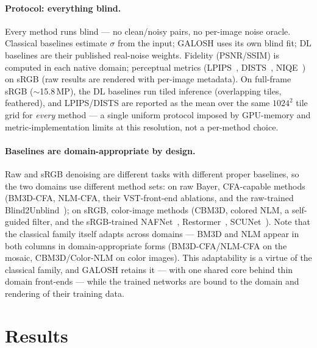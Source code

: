 \documentclass[10pt,twocolumn]{article}
\begin{document}
\paragraph{Protocol: everything blind.} Every method runs blind --- no
clean/noisy pairs, no per-image noise oracle. Classical baselines estimate
$\sigma$ from the input; GALOSH uses its own blind fit; DL baselines are their
published real-noise weights. Fidelity (PSNR/SSIM) is computed in each native
domain; perceptual metrics (LPIPS~\cite{lpips}, DISTS~\cite{dists},
NIQE~\cite{niqe}) on sRGB (raw results are rendered with per-image metadata).
On full-frame sRGB ($\sim$15.8\,MP), the DL baselines run tiled inference
(overlapping tiles, feathered), and LPIPS/DISTS are reported as the mean over
the same $1024^2$ tile grid for \emph{every} method --- a single uniform
protocol imposed by GPU-memory and metric-implementation limits at this
resolution, not a per-method choice.

\paragraph{Baselines are domain-appropriate by design.} Raw and sRGB denoising
are different tasks with different proper baselines, so the two domains use
different method sets: on raw Bayer, CFA-capable methods (BM3D-CFA, NLM-CFA,
their VST-front-end ablations, and the raw-trained Blind2Unblind~\cite{b2u});
on sRGB, color-image methods (CBM3D, colored NLM, a self-guided filter, and
the sRGB-trained NAFNet~\cite{nafnet}, Restormer~\cite{restormer},
SCUNet~\cite{scunet}). Note that the classical family itself adapts across
domains --- BM3D and NLM appear in both columns in domain-appropriate forms
(BM3D-CFA/NLM-CFA on the mosaic, CBM3D/Color-NLM on color images). This
adaptability is a virtue of the classical family, and GALOSH retains it ---
with one shared core behind thin domain front-ends --- while the trained
networks are bound to the domain and rendering of their training data.

\section{Results}\label{sec:results}
\end{document}
